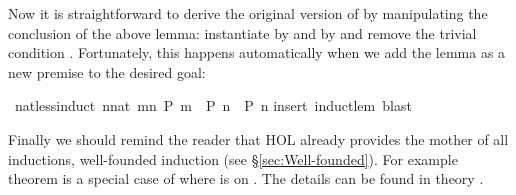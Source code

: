 \begin{isabellebody}
\begin{isamarkuptext}
Now it is straightforward to derive the original version of
 by manipulating the conclusion of the above
lemma: instantiate  by  and  by 
and remove the trivial condition . Fortunately, this
happens automatically when we add the lemma as a new premise to the
desired goal:%
\end{isamarkuptext}%
\ nat{\isacharunderscore}less{\isacharunderscore}induct{\isacharcolon}\ {\isachardoublequote}{\isacharparenleft}{\isasymAnd}n{\isacharcolon}{\isacharcolon}nat{\isachardot}\ {\isasymforall}m{\isacharless}n{\isachardot}\ P\ m\ {\isasymLongrightarrow}\ P\ n{\isacharparenright}\ {\isasymLongrightarrow}\ P\ n{\isachardoublequote}\isanewline
{}insert\ induct{\isacharunderscore}lem{\isacharcomma}\ blast{\isacharparenright}%
\begin{isamarkuptext}%
Finally we should remind the reader that HOL already provides the mother of
all inductions, well-founded induction (see \S\ref{sec:Well-founded}).  For
example theorem  is
a special case of  where  is \isa{{\isacharless}} on
. The details can be found in theory .%
\end{isamarkuptext}%
\end{isabellebody}%
